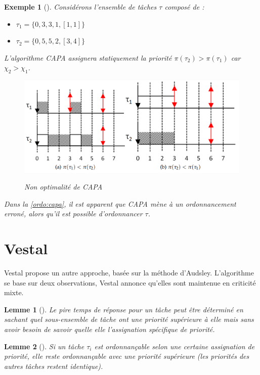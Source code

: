 \documentclass[12pt,a4paper,oneside]{book}
\theoremstyle{break}
\newtheorem{exem}{Exemple}[chapter]
\theoremstyle{breakplain}
\newtheorem{lem}{Lemme}[chapter]
\begin{document}
\begin{exem}[\cite{santy2012ordonnancement}]
Considérons l'ensemble de tâches $\tau$ composé de :
\begin{itemize}
\item $\tau_1 = \{0,3,3,1,[1,1]\}$
\item $\tau_2 = \{0,5,5,2,[3,4]\}$
\end{itemize}

L'algorithme \textit{CAPA} assignera statiquement la priorité $\pi(\tau_2) > \pi(\tau_1)$ car $\chi_2 > \chi_1$.

\begin{figure}[h]
\centering
\includegraphics[scale=0.25]{images/capa.png}
\label{ordo:capa}
\caption{Non optimalité de CAPA \cite{santy2012ordonnancement}}
\end{figure}

Dans la \autoref{ordo:capa}, il est apparent que \textit{CAPA} mène à un ordonnancement erroné, alors qu'il est possible d'ordonnancer $\tau$.

\end{exem}

\section{Vestal}
Vestal propose un autre approche\cite{vestal2007preemptive}, basée sur la méthode d'Audsley\cite{audsley1991optimal}. L'algorithme se base sur deux observations, Vestal annonce qu'elles sont maintenue en criticité mixte.

\begin{lem}[\cite{vestal2007preemptive}]
\label{ordo:vestal:low}
Le pire temps de réponse pour un tâche peut être déterminé en sachant quel sous-ensemble de tâche ont une priorité supérieure à elle mais sans avoir besoin de savoir quelle elle l'assignation spécifique de priorité.
\end{lem}

\begin{lem}[\cite{vestal2007preemptive}]
\label{ordo:vestal:higher}
Si un tâche $\tau_i$ est ordonnançable selon une certaine assignation de priorité, elle reste ordonnançable avec une priorité supérieure (les priorités des autres tâches restent identique).
\end{lem}
\end{document}
